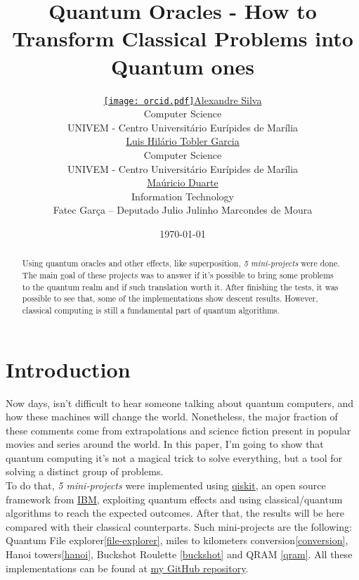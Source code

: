 \documentclass{article}
\title{Quantum Oracles - How to Transform Classical Problems into Quantum ones}
\date{\today}
\author{ 
	\href{https://orcid.org/0009-0008-9134-5974}{\texttt{[image: orcid.pdf]}\hspace{1mm}Alexandre Silva}\\
	Computer Science\\
	UNIVEM - Centro Universitário Eurípides de Marília\\
	\And
	\href{http://lattes.cnpq.br/5170103189904688}{\hspace{1mm}Luis Hilário Tobler Garcia} \\
	Computer Science\\
	UNIVEM - Centro Universitário Eurípides de Marília\\
	\And
	\href{http://lattes.cnpq.br/7265559606596355}{\hspace{1mm}Maúricio Duarte} \\
	Information Technology \\
	Fatec Garça – Deputado Julio Julinho Marcondes de Moura\\
}
\begin{document}
\maketitle

\begin{abstract}
	Using quantum oracles and other effects, like superposition, \emph{5 mini-projects} were done. The main goal of these projects was to answer if it's possible to bring some problems to the quantum realm and if such translation worth it. After finishing the tests, it was possible to see that, some of the implementations show descent results. However, classical computing is still a fundamental part of quantum algorithms.
\end{abstract}


\section{Introduction}
Now days, isn't difficult to hear someone talking about quantum computers, and how these machines will change the world. Nonetheless, the major fraction of these comments come from extrapolations and science fiction present in popular movies and series around the world. In this paper, I'm going to show that quantum computing it's not a magical trick to solve everything, but a tool for solving a distinct group of problems.\\
To do that, \emph{5 mini-projects} were implemented using \href{https://www.ibm.com/quantum/qiskit}{qiskit}, an open source framework from \href{https://www.ibm.com/}{IBM}, exploiting quantum effects and using classical/quantum algorithms to reach the expected outcomes. After that, the results will be here compared with their classical counterparts.
Such mini-projects are the following: Quantum File explorer\ref{file-explorer}, miles to kilometers conversion\ref{conversion}, Hanoi towers\ref{hanoi}, Buckshot Roulette \ref{buckshot} and QRAM \ref{qram}. All these implementations can be found at \href{https://github.com/Dpbm/scientific-initiation-1-quantum-oracles}{my GitHub repository}.
\end{document}

